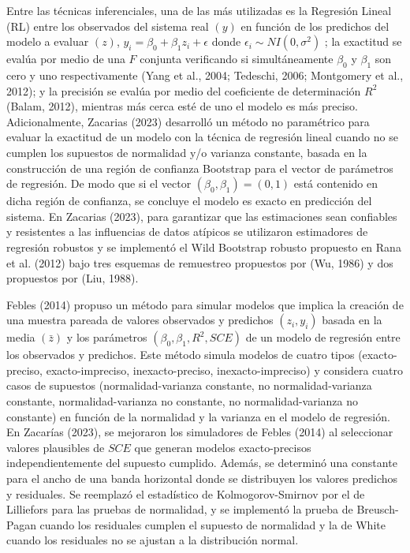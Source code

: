 Entre las técnicas inferenciales, una de las más utilizadas es la Regresión Lineal (RL) entre los observados del sistema real $ (y) $ en función de los predichos del modelo a evaluar $ (z) $, $ y_{i} = \beta_{0} + \beta_{1}z_{i} +\epsilon $  donde $ \epsilon_{i} \sim NI(0,\sigma^{2}) $ ; la exactitud se evalúa por medio de una $ F $ conjunta verificando si simultáneamente $ \beta_{0} $ y $ \beta_{1} $ son cero y uno respectivamente (Yang et al., 2004; Tedeschi, 2006; Montgomery et al., 2012); y la precisión se evalúa por medio del coeficiente de determinación $ R^{2} $ (Balam, 2012), mientras más cerca esté de uno el modelo es más preciso.
Adicionalmente, Zacarias (2023) desarrolló un método no paramétrico para evaluar la exactitud de un modelo con la técnica de regresión lineal cuando no se cumplen los supuestos de normalidad y/o varianza constante, basada en la construcción de una región de confianza Bootstrap para el vector de parámetros de regresión. De modo que si el vector  $ (\beta_{0},\beta_{1})=(0,1) $ está contenido en dicha región de confianza, se concluye el modelo es exacto en predicción del sistema. En Zacarias (2023), para garantizar que las estimaciones sean confiables y resistentes a las influencias de datos atípicos se utilizaron estimadores de regresión robustos y se implementó el Wild Bootstrap robusto propuesto en Rana et al. (2012) bajo tres esquemas de remuestreo propuestos por (Wu, 1986) y dos propuestos por (Liu, 1988).
\vspace{.5cm}

Febles (2014) propuso un método para simular modelos que implica la creación de una muestra pareada de valores observados y predichos $ (z_{i},y_{i}) $ basada en la media $ (\bar{z}) $ y los parámetros $ (\beta_{0}, \beta_{1}, R^{2}, SCE) $ de un modelo de regresión entre los observados y predichos. Este método simula modelos de cuatro tipos (exacto-preciso, exacto-impreciso, inexacto-preciso, inexacto-impreciso) y considera cuatro casos de supuestos (normalidad-varianza constante, no normalidad-varianza constante, normalidad-varianza no constante, no normalidad-varianza no constante) en función de la normalidad y la varianza en el modelo de regresión. En Zacarías (2023), se mejoraron los simuladores de Febles (2014) al seleccionar valores plausibles de $ SCE $ que generan modelos exacto-precisos independientemente del supuesto cumplido. Además, se determinó una constante para el ancho de una banda horizontal donde se distribuyen los valores predichos y residuales. Se reemplazó el estadístico de Kolmogorov-Smirnov por el de Lilliefors para las pruebas de normalidad, y se implementó la prueba de Breusch-Pagan cuando los residuales cumplen el supuesto de normalidad y la de White cuando los residuales no se ajustan a la distribución normal.
\vspace{.5cm}

